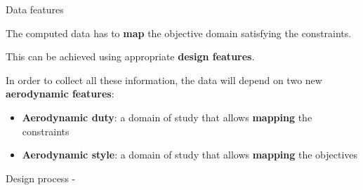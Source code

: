 \begin{frame}{Data features}
    \vspace{0.5cm}
    
    The computed data has to \textbf{map} the objective domain satisfying the constraints. 
    \newline
    \vspace{0.2cm}
    
    This can be achieved using appropriate \textbf{design features}.
    \newline
    \vspace{0.2cm}
    
    In order to collect all these information, the data will depend on two new \textbf{aerodynamic features}: 
    \newline
    \vspace{0.2cm}

    \begin{itemize}
        \setlength{\itemsep}{15pt}
        \item \textbf{Aerodynamic duty}: a domain of study that allows \textbf{mapping} the constraints
        \item \textbf{Aerodynamic style}: a domain of study that allows \textbf{mapping} the objectives
    \end{itemize} 
\end{frame}

\begin{frame}{Design process - }
    \begin{figure}
        \centering
        
    \end{figure}
\end{frame}